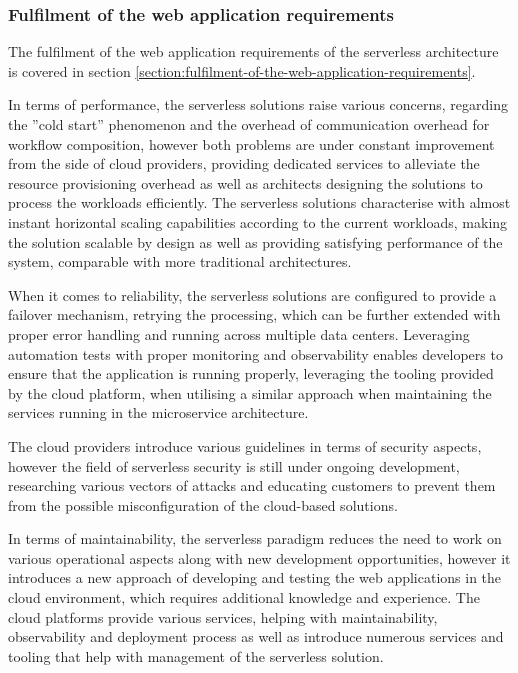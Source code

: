 \subsubsection{Fulfilment of the web application requirements}

The fulfilment of the web application requirements of the serverless architecture is covered in section \ref{section:fulfilment-of-the-web-application-requirements}.

In terms of performance, the serverless solutions raise various concerns, regarding the ''cold start'' phenomenon and the overhead of communication overhead for workflow composition, however both problems are under constant improvement from the side of cloud providers, providing dedicated services to alleviate the resource provisioning overhead as well as architects designing the solutions to process the workloads efficiently.
The serverless solutions characterise with almost instant horizontal scaling capabilities according to the current workloads, making the solution scalable by design as well as providing satisfying performance of the system, comparable with more traditional architectures.

When it comes to reliability, the serverless solutions are configured to provide a failover mechanism, retrying the processing, which can be further extended with proper error handling and running across multiple data centers.
Leveraging automation tests with proper monitoring and observability enables developers to ensure that the application is running properly, leveraging the tooling provided by the cloud platform, when utilising a similar approach when maintaining the services running in the microservice architecture.

The cloud providers introduce various guidelines in terms of security aspects, however the field of serverless security is still under ongoing development, researching various vectors of attacks and educating customers to prevent them from the possible misconfiguration of the cloud-based solutions.

In terms of maintainability, the serverless paradigm reduces the need to work on various operational aspects along with new development opportunities, however it introduces a new approach of developing and testing the web applications in the cloud environment, which requires additional knowledge and experience.
The cloud platforms provide various services, helping with maintainability, observability and deployment process as well as introduce numerous services and tooling that help with management of the serverless solution.

